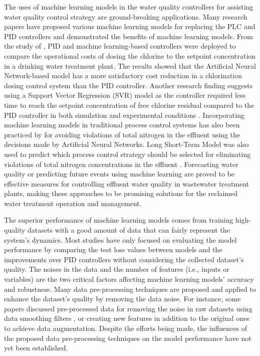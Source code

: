The uses of machine learning models in the water quality controllers for assisting water quality control strategy are ground-breaking applications. Many research papers have proposed various machine learning models for replacing the PLC and PID controllers and demonstrated the benefits of machine learning models. From the study of \citep{librantzArtificialNeuralNetworks2018}, PID and machine learning-based controllers were deployed to compare the operational costs of dosing the chlorine to the setpoint concentration in a drinking water treatment plant. The results showed that the Artificial Neural Network-based model has a more satisfactory cost reduction in a chlorination dosing control system than the PID controller. Another research finding suggests using a Support Vector Regression (SVR) model as the controller required less time to reach the setpoint concentration of free chlorine residual compared to the PID controller in both simulation and experimental conditions \citet{wangModelPredictiveControl2020}. Incorporating machine learning models in traditional process control systems has also been practiced by \citet{santinFuzzyControlModel2015} for avoiding violations of total nitrogen in the effluent using the decisions made by Artificial Neural Networks. Long Short-Term Model was also used to predict which process control strategy should be selected for eliminating violations of total nitrogen concentrations in the effluent \cite{pisaLSTMBasedWastewaterTreatment2019}. Forecasting water quality or predicting future events using machine learning are proved to be effective measures for controlling effluent water quality in wastewater treatment plants, making these approaches to be promising solutions for the reclaimed water treatment operation and management.

The superior performance of machine learning models comes from training high-quality datasets with a good amount of data that can fairly represent the system's dynamics. Most studies have only focused on evaluating the model performance by comparing the test loss values between models and the improvements over PID controllers without considering the collected dataset's quality. The noises in the data and the number of features (i.e., inputs or variables) are the two critical factors affecting machine learning models' accuracy and robustness. Many data pre-processing techniques are proposed and applied to enhance the dataset's quality by removing the data noise. For instance, some papers discussed pre-processed data for removing the noise in raw datasets using data smoothing filters \citep{chengForecastingWastewaterTreatment2020}, or creating new features in addition to the original ones \citep{mamandipoorMonitoringDetectingFaults2020} to achieve data augmentation. Despite the efforts being made, the influences of the proposed data pre-processing techniques on the model performance have not yet been established.

